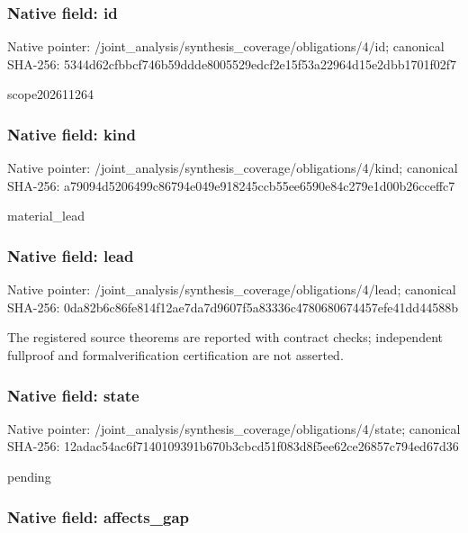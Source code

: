 \documentclass[10pt,a4paper]{article}
\begin{document}
\subsubsection{Native field: id}


Native pointer: /joint\_analysis/synthesi\allowbreak{}s\_coverage/obligations/4\allowbreak{}/id; canonical SHA-256: 5344d62cfbbcf746b59ddde8\allowbreak{}005529edcf2e15f53a22964d\allowbreak{}15e2dbb1701f02f7


scope202611264


\subsubsection{Native field: kind}


Native pointer: /joint\_analysis/synthesi\allowbreak{}s\_coverage/obligations/4\allowbreak{}/kind; canonical SHA-256: a79094d5206499c86794e049\allowbreak{}e918245ccb55ee6590e84c27\allowbreak{}9e1d00b26cceffc7


material\_lead


\subsubsection{Native field: lead}


Native pointer: /joint\_analysis/synthesi\allowbreak{}s\_coverage/obligations/4\allowbreak{}/lead; canonical SHA-256: 0da82b6c86fe814f12ae7da7\allowbreak{}d9607f5a83336c4780680674\allowbreak{}457efe41dd44588b


The registered source theorems are reported with contract checks; independent fullproof and formalverification certification are not asserted.


\subsubsection{Native field: state}


Native pointer: /joint\_analysis/synthesi\allowbreak{}s\_coverage/obligations/4\allowbreak{}/state; canonical SHA-256: 12adac54ac6f7140109391b6\allowbreak{}70b3cbcd51f083d8f5ee62ce\allowbreak{}26857c794ed67d36


pending


\subsubsection{Native field: affects\_gap}
\end{document}
